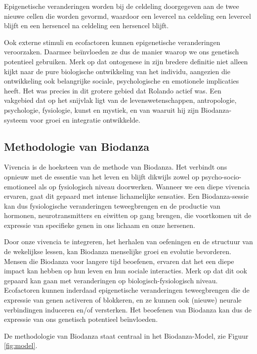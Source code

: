 \documentclass[
  11pt,
]{book}
\begin{document}
Epigenetische veranderingen worden bij de celdeling doorgegeven aan de twee nieuwe cellen die worden gevormd, waardoor een levercel na celdeling een levercel blijft en een hersencel na celdeling een hersencel blijft.

Ook externe stimuli en ecofactoren kunnen epigenetische veranderingen veroorzaken.
Daarmee beïnvloeden ze dus de manier waarop we ons genetisch potentieel gebruiken.
Merk op dat ontogenese in zijn bredere definitie niet alleen kijkt naar de pure biologische ontwikkeling van het individu, aangezien die ontwikkeling ook belangrijke sociale, psychologische en emotionele implicaties heeft. Het was precies in dit grotere gebied dat Rolando actief was. Een vakgebied dat op het snijvlak ligt van de levenswetenschappen, antropologie, psychologie, fysiologie, kunst en mystiek, en van waaruit hij zijn Biodanza-systeem voor groei en integratie ontwikkelde.

\subsection{Methodologie van Biodanza}\label{methodologie-van-biodanza}

Vivencia is de hoeksteen van de methode van Biodanza. Het verbindt ons opnieuw met de essentie van het leven en blijft dikwijls zowel op psycho-socio-emotioneel als op fysiologisch niveau doorwerken. Wanneer we een diepe vivencia ervaren, gaat dit gepaard met intense lichamelijke sensaties. Een Biodanza-sessie kan dus fysiologische veranderingen teweegbrengen en de productie van hormonen, neurotransmitters en eiwitten op gang brengen, die voortkomen uit de expressie van specifieke genen in ons lichaam en onze hersenen.

Door onze vivencia te integreren, het herhalen van oefeningen en de structuur van de wekelijkse lessen, kan Biodanza menselijke groei en evolutie bevorderen. Mensen die Biodanza voor langere tijd beoefenen, ervaren dat het een diepe impact kan hebben op hun leven en hun sociale interacties. Merk op dat dit ook gepaard kan gaan met veranderingen op biologisch-fysiologisch niveau. Ecofactoren kunnen inderdaad epigenetische veranderingen teweegbrengen die de expressie van genen activeren of blokkeren, en ze kunnen ook (nieuwe) neurale verbindingen induceren en/of versterken. Het beoefenen van Biodanza kan dus de expressie van ons genetisch potentieel beïnvloeden.

De methodologie van Biodanza staat centraal in het Biodanza-Model, zie Figuur \ref{fig:model}.
\end{document}

